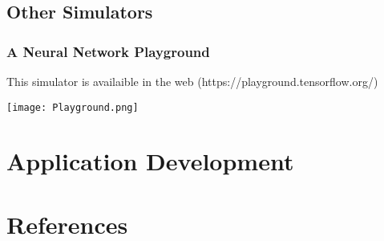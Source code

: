 \documentclass{report}
\begin{document}
    \section{Other Simulators}
        \subsection{A Neural Network Playground}
            This simulator is availaible in the web (https://playground.tensorflow.org/)
            \begin{center}
                \texttt{[image: Playground.png]}
            \end{center}  
\chapter{Application Development}

\chapter{References}
\end{document}
